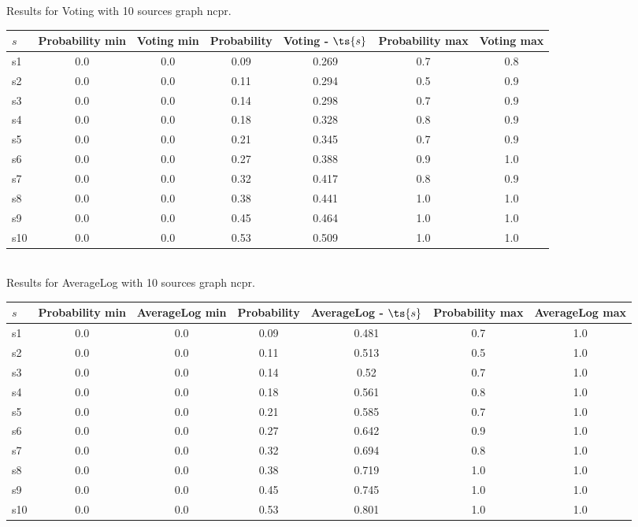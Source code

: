 \documentclass{article}
\begin{document}
\noindent Results for Voting with 10 sources graph ncpr.

\noindent\begin{tabular}{|l|c|c|c|c|c|c|}
\hline
$s$& Probability min & Voting min & Probability & Voting - $\ts{s}$ & Probability max & Voting max\\
\hline
s1 &0.0 & 0.0 & 0.09 & 0.269 & 0.7 & 0.8\\
\hline
s2 &0.0 & 0.0 & 0.11 & 0.294 & 0.5 & 0.9\\
\hline
s3 &0.0 & 0.0 & 0.14 & 0.298 & 0.7 & 0.9\\
\hline
s4 &0.0 & 0.0 & 0.18 & 0.328 & 0.8 & 0.9\\
\hline
s5 &0.0 & 0.0 & 0.21 & 0.345 & 0.7 & 0.9\\
\hline
s6 &0.0 & 0.0 & 0.27 & 0.388 & 0.9 & 1.0\\
\hline
s7 &0.0 & 0.0 & 0.32 & 0.417 & 0.8 & 0.9\\
\hline
s8 &0.0 & 0.0 & 0.38 & 0.441 & 1.0 & 1.0\\
\hline
s9 &0.0 & 0.0 & 0.45 & 0.464 & 1.0 & 1.0\\
\hline
s10 &0.0 & 0.0 & 0.53 & 0.509 & 1.0 & 1.0\\
\hline
\end{tabular}\\

\noindent Results for AverageLog with 10 sources graph ncpr.

\noindent\begin{tabular}{|l|c|c|c|c|c|c|}
\hline
$s$& Probability min & AverageLog min & Probability & AverageLog - $\ts{s}$ & Probability max & AverageLog max\\
\hline
s1 &0.0 & 0.0 & 0.09 & 0.481 & 0.7 & 1.0\\
\hline
s2 &0.0 & 0.0 & 0.11 & 0.513 & 0.5 & 1.0\\
\hline
s3 &0.0 & 0.0 & 0.14 & 0.52 & 0.7 & 1.0\\
\hline
s4 &0.0 & 0.0 & 0.18 & 0.561 & 0.8 & 1.0\\
\hline
s5 &0.0 & 0.0 & 0.21 & 0.585 & 0.7 & 1.0\\
\hline
s6 &0.0 & 0.0 & 0.27 & 0.642 & 0.9 & 1.0\\
\hline
s7 &0.0 & 0.0 & 0.32 & 0.694 & 0.8 & 1.0\\
\hline
s8 &0.0 & 0.0 & 0.38 & 0.719 & 1.0 & 1.0\\
\hline
s9 &0.0 & 0.0 & 0.45 & 0.745 & 1.0 & 1.0\\
\hline
s10 &0.0 & 0.0 & 0.53 & 0.801 & 1.0 & 1.0\\
\hline
\end{tabular}\\
\end{document}
